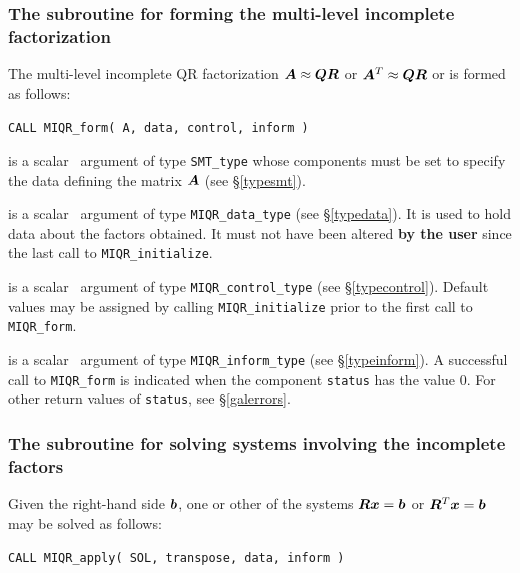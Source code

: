 \documentclass{galahad}
\newcommand{\packagename}{MIQR}
\begin{document}

\subsubsection{The subroutine for forming the multi-level incomplete factorization}
The multi-level incomplete QR factorization ${\bm{A}} \approx {\bm{Q}} {\bm{R}}$ or
${\bm{A}}^T \approx {\bm{Q}} {\bm{R}}$ or is formed as follows:
\vspace*{1mm}

\hspace{8mm}
{\tt CALL \packagename\_form(  A, data, control, inform )}

\vspace*{-3mm}
\begin{description}
 is a scalar \intentin\ argument of type {\tt SMT\_type} whose
components must be set to specify the data defining the matrix ${\bm{A}}$ 
(see \S\ref{typesmt}).

 is a scalar \intentinout\ argument of type 
{\tt \packagename\_data\_type}
(see \S\ref{typedata}). It is used to hold data about the factors obtained.
It must not have been altered {\bf by the user} since the last call to 
{\tt \packagename\_initialize}.

 is a scalar \intentin\ argument of type 
{\tt \packagename\_control\_type}
(see \S\ref{typecontrol}). Default values may be assigned by calling 
{\tt \packagename\_initialize} prior to the first call to 
{\tt \packagename\_form}.

 is a scalar \intentout\ argument of type 
{\tt \packagename\_inform\_type}
(see \S\ref{typeinform}). A successful call to
{\tt \packagename\_form}
is indicated when the  component {\tt status} has the value 0. 
For other return values of {\tt status}, see \S\ref{galerrors}.

\end{description}


\subsubsection{The subroutine for solving systems involving the incomplete
factors}
Given the right-hand side ${\bm{b}}$, one or other of the systems 
${\bm{R}} {\bm{x}} = {\bm{b}}$ or ${\bm{R}}^T {\bm{x}} = {\bm{b}}$ may be solved as follows:
\vspace*{1mm}

\hspace{8mm}
{\tt CALL \packagename\_apply(  SOL, transpose, data, inform )}
\end{document}
